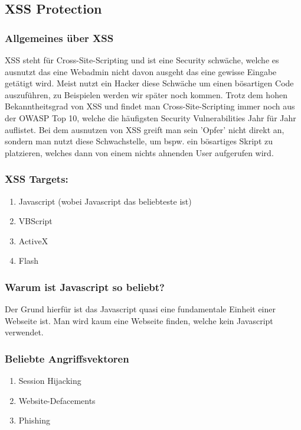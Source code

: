 \subsection{XSS Protection}
\label{sec:xss}
\subsubsection{Allgemeines über XSS}
\label{sec:xss_allgemein}
XSS steht für Cross-Site-Scripting und ist eine Security schwäche, welche es ausnutzt das eine Webadmin nicht davon ausgeht das eine gewisse Eingabe getätigt wird. Meist nutzt ein Hacker diese Schwäche um einen bösartigen Code auszuführen, zu Beispielen werden wir später noch kommen. Trotz dem hohen Bekanntheitsgrad von XSS und findet man Cross-Site-Scripting immer noch aus der OWASP Top 10, welche die häufigsten Security Vulnerabilities Jahr für Jahr auflistet. Bei dem ausnutzen von XSS greift man sein 'Opfer' nicht direkt an, sondern man nutzt diese Schwachstelle, um bspw. ein bösartiges Skript zu platzieren, welches dann von einem nichts ahnenden User aufgerufen wird. 
\subsubsection{XSS Targets:}
\label{sec:xss_targets}
\begin{enumerate}
\item Javascript (wobei Javascript das beliebteste ist) 
\item VBScript 
\item ActiveX
\item Flash
\end{enumerate}
\subsubsection{Warum ist Javascript so beliebt?}
\label{sec:xss_why}
Der Grund hierfür ist das Javascript quasi eine fundamentale Einheit einer Webseite ist. Man wird kaum eine Webseite finden, welche kein Javascript verwendet.
\subsubsection{Beliebte Angriffsvektoren}
\label{sec:xss_bel_agg}
\begin{enumerate}
\item Session Hijacking
\item Website-Defacements 
\item Phishing
\end{enumerate}
